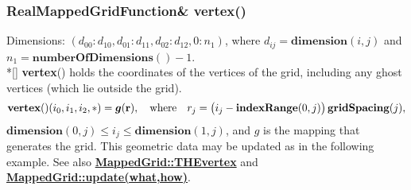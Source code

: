 \documentclass{article}
\begin{document}
  \subsubsection{RealMappedGridFunction\& vertex()}
  \label{MappedGrid::vertex()}
    Dimensions: $(d_{00}\colon d_{10},d_{01}\colon d_{11},d_{02}\colon d_{12},0\colon n_1)$,
    where $d_{ij} = \textbf{dimension}(i,j)$ and $n_1 = \textbf{numberOfDimensions}() - 1$. \\*[\parskip]
    \textbf{vertex}() holds the coordinates of the vertices of the grid, including any ghost vertices (which lie outside the grid).
    \[
      \textbf{vertex}()(i_0,i_1,i_2,\ast) = \mbox{\boldmath $g$}(\textbf{r}),
      \quad\mbox{where}\quad
      r_j = \big(i_j - \textbf{indexRange}(0,j)\big)\,\textbf{gridSpacing}(j),
    \]
    $\textbf{dimension}(0,j) \le i_j \le \textbf{dimension}(1,j)$, and {\boldmath $g$} is the mapping that generates the grid.
    This geometric data may be updated as in the following example.
    See also {\bf{}\hyperref{THEvertex}{THEvertex \rm(\S}{)}{MappedGrid::THEvertex}} and
    {\bf{}\hyperref{update(what,how)}{update(what,how) \rm(\S}{)}{MappedGrid::update(what,how)}}.
\end{document}
